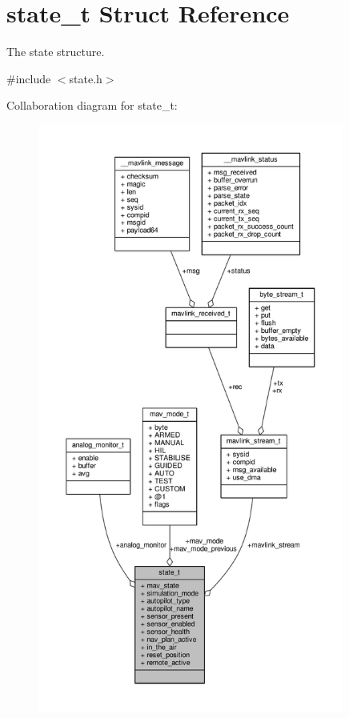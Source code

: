\hypertarget{structstate__t}{\section{state\+\_\+t Struct Reference}
\label{structstate__t}
}


The state structure.  




{\ttfamily \#include $<$state.\+h$>$}



Collaboration diagram for state\+\_\+t\+:
\nopagebreak
\begin{figure}[H]
\begin{center}
\leavevmode
\includegraphics[height=550pt]{structstate__t__coll__graph}
\end{center}
\end{figure}
